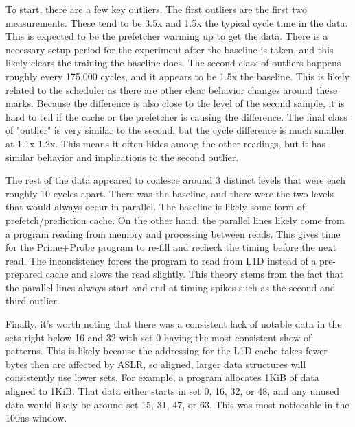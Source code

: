 \documentclass[article]{IEEEtran}
\begin{document}
To start, there are a few key outliers. The first outliers are the first two measurements. These tend to be 3.5x and 1.5x the typical cycle time in the data. This is expected to be the prefetcher warming up to get the data. There is a necessary setup period for the experiment after the baseline is taken, and this likely clears the training the baseline does. The second class of outliers happens roughly every 175,000 cycles, and it appears to be 1.5x the baseline. This is likely related to the scheduler as there are other clear behavior changes around these marks. Because the difference is also close to the level of the second sample, it is hard to tell if the cache or the prefetcher is causing the difference. The final class of "outlier" is very similar to the second, but the cycle difference is much smaller at 1.1x-1.2x. This means it often hides among the other readings, but it has similar behavior and implications to the second outlier.

The rest of the data appeared to coalesce around 3 distinct levels that were each roughly 10 cycles apart. There was the baseline, and there were the two levels that would always occur in parallel. The baseline is likely some form of prefetch/prediction cache. On the other hand, the parallel lines likely come from a program reading from memory and processing between reads. This gives time for the Prime+Probe program to re-fill and recheck the timing before the next read. The inconsistency forces the program to read from L1D instead of a pre-prepared cache and slows the read slightly. This theory stems from the fact that the parallel lines always start and end at timing spikes such as the second and third outlier.

Finally, it's worth noting that there was a consistent lack of notable data in the sets right below 16 and 32 with set 0 having the most consistent show of patterns. This is likely because the addressing for the L1D cache takes fewer bytes then are affected by ASLR, so aligned, larger data structures will consistently use lower sets. For example, a program allocates 1KiB of data aligned to 1KiB. That data either starts in set 0, 16, 32, or 48, and any unused data would likely be around set 15, 31, 47, or 63. This was most noticeable in the 100ns window.
\end{document}
